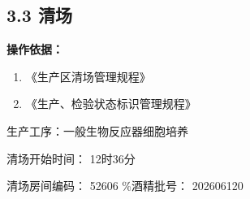 \documentclass[UTF8,10pt,a4paper,fontset=fandol]{ctexart}
\newcommand{\fieldvalue}[1]{#1}
\newcommand{\handwritten}[1]{#1}
\begin{document}
\subsection*{3.3 清场}

\textbf{操作依据：}

\begin{enumerate}
\item 《生产区清场管理规程》
\item 《生产、检验状态标识管理规程》
\end{enumerate}

生产工序：一般生物反应器细胞培养

\noindent
清场开始时间：
\fieldvalue{\handwritten{12时36分}}

\noindent
清场房间编码：
\fieldvalue{\handwritten{52606}}
\%酒精批号：
\fieldvalue{\handwritten{202606120}}
\end{document}
